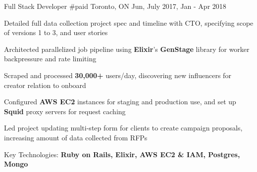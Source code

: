 

\begin{cventries}

  \cventry
    {Full Stack Developer} %
    {\#paid} %
    {Toronto, ON} %
    {Jun, July 2017, Jan - Apr 2018} %
    {
      \begin{cvitems} %
        \item {Detailed full data collection project spec and timeline with CTO, specifying scope of versions 1 to 3, and user stories}
        \item {Architected parallelized job pipeline using \textbf{Elixir}'s \textbf{GenStage} library for worker backpressure and rate limiting}
        \item {Scraped and processed \textbf{30,000+} users/day, discovering new influencers for creator relation to onboard}
        \item {Configured \textbf{AWS EC2} instances for staging and production use, and set up \textbf{Squid} proxy servers for request caching}
        \item {Led project updating multi-step form for clients to create campaign proposals, increasing amount of data collected from RFPs}
        \item {Key Technologies: \textbf{Ruby on Rails, Elixir, AWS EC2 \& IAM, Postgres, Mongo}}
      \end{cvitems}
    }

\end{cventries}
